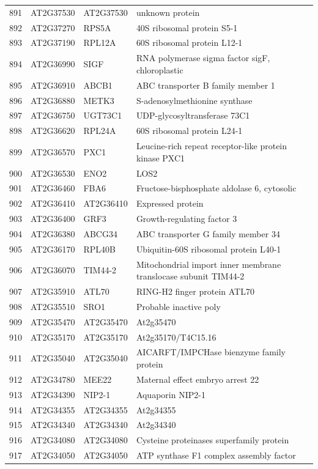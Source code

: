 \documentclass[11pt]{article}
\begin{document}
\begin{center}
\begin{tabular}{rlll}
891 & AT2G37530 & AT2G37530 & unknown protein\\
892 & AT2G37270 & RPS5A & 40S ribosomal protein S5-1\\
893 & AT2G37190 & RPL12A & 60S ribosomal protein L12-1\\
894 & AT2G36990 & SIGF & RNA polymerase sigma factor sigF, chloroplastic\\
895 & AT2G36910 & ABCB1 & ABC transporter B family member 1\\
896 & AT2G36880 & METK3 & S-adenosylmethionine synthase\\
897 & AT2G36750 & UGT73C1 & UDP-glycosyltransferase 73C1\\
898 & AT2G36620 & RPL24A & 60S ribosomal protein L24-1\\
899 & AT2G36570 & PXC1 & Leucine-rich repeat receptor-like protein kinase PXC1\\
900 & AT2G36530 & ENO2 & LOS2\\
901 & AT2G36460 & FBA6 & Fructose-bisphosphate aldolase 6, cytosolic\\
902 & AT2G36410 & AT2G36410 & Expressed protein\\
903 & AT2G36400 & GRF3 & Growth-regulating factor 3\\
904 & AT2G36380 & ABCG34 & ABC transporter G family member 34\\
905 & AT2G36170 & RPL40B & Ubiquitin-60S ribosomal protein L40-1\\
906 & AT2G36070 & TIM44-2 & Mitochondrial import inner membrane translocase subunit TIM44-2\\
907 & AT2G35910 & ATL70 & RING-H2 finger protein ATL70\\
908 & AT2G35510 & SRO1 & Probable inactive poly\\
909 & AT2G35470 & AT2G35470 & At2g35470\\
910 & AT2G35170 & AT2G35170 & At2g35170/T4C15.16\\
911 & AT2G35040 & AT2G35040 & AICARFT/IMPCHase bienzyme family protein\\
912 & AT2G34780 & MEE22 & Maternal effect embryo arrest 22\\
913 & AT2G34390 & NIP2-1 & Aquaporin NIP2-1\\
914 & AT2G34355 & AT2G34355 & At2g34355\\
915 & AT2G34340 & AT2G34340 & At2g34340\\
916 & AT2G34080 & AT2G34080 & Cysteine proteinases superfamily protein\\
917 & AT2G34050 & AT2G34050 & ATP synthase F1 complex assembly factor\\

\end{tabular}
\end{center}
\end{document}
